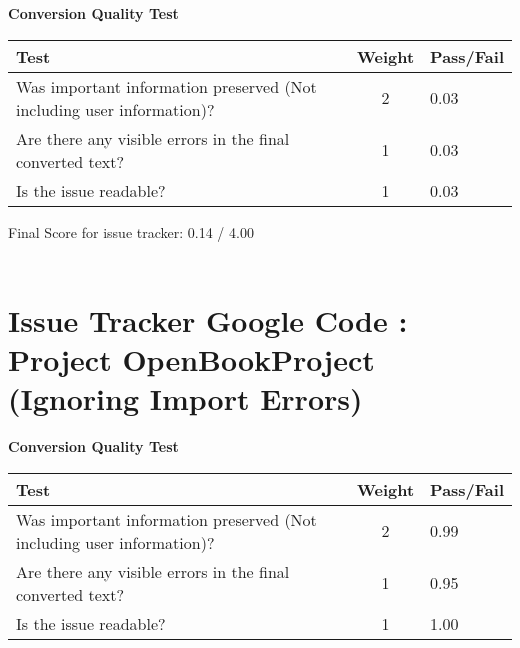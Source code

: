 \documentclass{article}
\begin{document}
\textbf{Conversion Quality Test}
\begin{center}
	\renewcommand{\arraystretch}{1.5}
	\begin{tabular}{ p{6cm} | c | l }
		Test & Weight & Pass/Fail \\ \hline
		Was important information preserved (Not including user information)? & 2 & 0.03 \\
		Are there any visible errors in the final converted text? & 1 & 0.03 \\
		Is the issue readable? & 1 & 0.03 \\
	\end{tabular}
\end{center}
Final Score for issue tracker: 0.14 / 4.00 \\ \\	\pagebreak\section{Issue Tracker Google Code : Project OpenBookProject (Ignoring Import Errors)}
\textbf{Conversion Quality Test}
\begin{center}
	\renewcommand{\arraystretch}{1.5}
	\begin{tabular}{ p{6cm} | c | l }
		Test & Weight & Pass/Fail \\ \hline
		Was important information preserved (Not including user information)? & 2 & 0.99 \\
		Are there any visible errors in the final converted text? & 1 & 0.95 \\
		Is the issue readable? & 1 & 1.00 \\
	\end{tabular}
\end{center}
\end{document}
